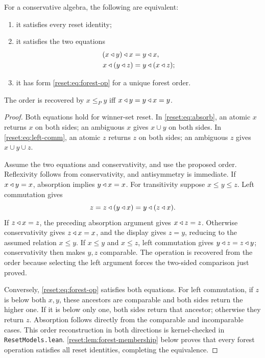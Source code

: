 \begin{proposition}\label{reset:thm:forest}
For a conservative algebra, the following are equivalent:
\begin{enumerate}
\item it satisfies every reset identity;
\item it satisfies the two equations
\begin{align}
 (x\mathbin{\triangleleft} y)\mathbin{\triangleleft} x&=y\mathbin{\triangleleft} x,\label{reset:eq:absorb}\\
 x\mathbin{\triangleleft}(y\mathbin{\triangleleft} z)&=y\mathbin{\triangleleft}(x\mathbin{\triangleleft} z);\label{reset:eq:left-comm}
\end{align}
\item it has form \eqref{reset:eq:forest-op} for a unique forest order.
\end{enumerate}
The order is recovered by
$x\leq_P y$ iff $x\mathbin{\triangleleft} y=y\mathbin{\triangleleft} x=y$.
\end{proposition}
\begin{proof}
Both equations hold for winner-set reset. In
\eqref{reset:eq:absorb}, an atomic $x$ returns $x$ on both sides; an
ambiguous $x$ gives $x\cup y$ on both sides.
In \eqref{reset:eq:left-comm}, an atomic $z$ returns $z$ on both sides;
an ambiguous $z$ gives $x\cup y\cup z$.

Assume the two equations and conservativity, and use the proposed
order. Reflexivity follows from conservativity, and antisymmetry is
immediate. If $x\mathbin{\triangleleft} y=x$, absorption implies $y\mathbin{\triangleleft} x=x$.
For transitivity suppose $x\leq y\leq z$. Left commutation gives
\[
 z=z\mathbin{\triangleleft}(y\mathbin{\triangleleft} x)=y\mathbin{\triangleleft}(z\mathbin{\triangleleft} x).
\]
If $z\mathbin{\triangleleft} x=z$, the preceding absorption argument gives $x\mathbin{\triangleleft} z=z$.
Otherwise conservativity gives $z\mathbin{\triangleleft} x=x$, and the display gives
$z=y$, reducing to the assumed relation $x\leq y$.
If $x\leq y$ and $x\leq z$, left commutation gives
$y\mathbin{\triangleleft} z=z\mathbin{\triangleleft} y$; conservativity then makes $y,z$ comparable.
The operation is recovered from the order because selecting the left
argument forces the two-sided comparison just proved.

Conversely, \eqref{reset:eq:forest-op} satisfies both equations.
For left commutation, if $z$ is below both $x,y$, these ancestors
are comparable and both sides return the higher one. If it is below
only one, both sides return that ancestor; otherwise they return $z$.
Absorption follows directly from the comparable and incomparable cases.
This order reconstruction in both directions is kernel-checked in
\texttt{ResetModels.lean}. \cref{reset:lem:forest-membership} below proves
that every forest operation satisfies all reset identities, completing
the equivalence.
\end{proof}

